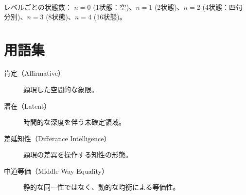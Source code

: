 \documentclass[12pt,a4paper]{ujarticle}
\begin{document}
レベルごとの状態数：
$n=0$ (1状態：空)、$n=1$ (2状態)、$n=2$ (4状態：四句分別)、$n=3$ (8状態)、$n=4$ (16状態)。

\appendix

\section{用語集}

\begin{description}
    \item[肯定（Affirmative）] 顕現した空間的な象限。
    \item[潜在（Latent）] 時間的な深度を伴う未確定領域。
    \item[差延知性（Differance Intelligence）] 顕現の差異を操作する知性の形態。
    \item[中道等価（Middle-Way Equality）] 静的な同一性ではなく、動的な均衡による等価性。
\end{description}
\end{document}
